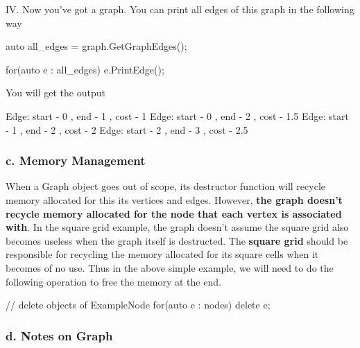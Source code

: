 I\-V. Now you've got a graph. You can print all edges of this graph in the following way


\begin{DoxyCode}
\textcolor{keyword}{auto} all\_edges = graph.GetGraphEdges();

\textcolor{keywordflow}{for}(\textcolor{keyword}{auto} e : all\_edges)
    e.PrintEdge();
\end{DoxyCode}


You will get the output


\begin{DoxyCode}
Edge: start - 0 , end - 1 , cost - 1
Edge: start - 0 , end - 2 , cost - 1.5
Edge: start - 1 , end - 2 , cost - 2
Edge: start - 2 , end - 3 , cost - 2.5
\end{DoxyCode}


\subsubsection*{c. Memory Management}

When a Graph object goes out of scope, its destructor function will recycle memory allocated for this its vertices and edges. However, {\bfseries the graph doesn't recycle memory allocated for the node that each vertex is associated with}. In the square grid example, the graph doesn't assume the square grid also becomes useless when the graph itself is destructed. The {\bfseries square grid} should be responsible for recycling the memory allocated for its square cells when it becomes of no use. Thus in the above simple example, we will need to do the following operation to free the memory at the end.


\begin{DoxyCode}
\textcolor{comment}{// delete objects of ExampleNode}
\textcolor{keywordflow}{for}(\textcolor{keyword}{auto} e : nodes)
        \textcolor{keyword}{delete} e;
\end{DoxyCode}


\subsubsection*{d. Notes on Graph}


